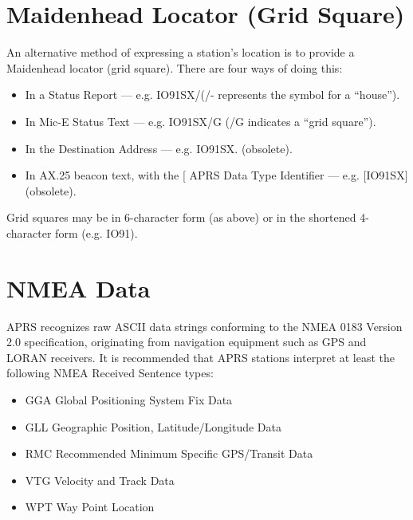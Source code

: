 \section{Maidenhead Locator (Grid Square)}

An alternative method of expressing a station’s location is to provide a
Maidenhead locator (grid square). There are four ways of doing this:

\begin{itemize}
  
\item In a Status Report — e.g. IO91SX/(/- represents the symbol for a “house”).

\item In Mic-E Status Text — e.g. IO91SX/G
(/G indicates a “grid square”).

\item In the Destination Address — e.g. IO91SX. (obsolete).

\item In AX.25 beacon text, with the [ APRS Data Type Identifier — e.g.
[IO91SX] (obsolete).

\end{itemize}

Grid squares may be in 6-character form (as above) or in the shortened
4-character form (e.g. IO91).

\section{NMEA Data}

APRS recognizes raw ASCII data strings conforming to the NMEA 0183
Version 2.0 specification, originating from navigation equipment such as
GPS and LORAN receivers. It is recommended that APRS stations interpret
at least the following NMEA Received Sentence types:

\begin{itemize}

\item GGA Global Positioning System Fix Data
\item GLL Geographic Position, Latitude/Longitude Data
\item RMC Recommended Minimum Specific GPS/Transit Data
\item VTG Velocity and Track Data
\item WPT Way Point Location


\end{itemize}



